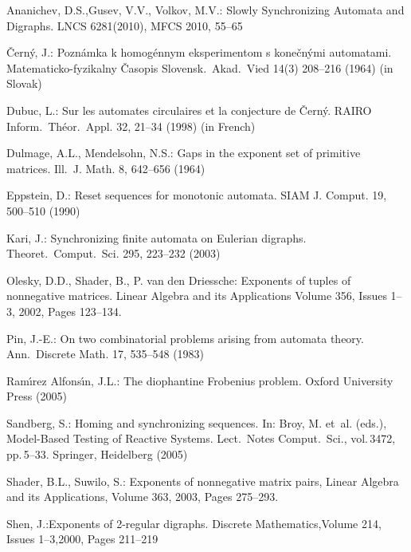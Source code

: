 \documentclass[11pt]{llncs}
\begin{document}
\begin{thebibliography}{99}


Ananichev, D.S.,Gusev, V.V., Volkov, M.V.: Slowly Synchronizing Automata and Digraphs.
LNCS 6281(2010), MFCS 2010, 55--65


\v{C}ern\'{y}, J.: Pozn\'{a}mka k homog\'{e}nnym eksperimentom s
kone\v{c}n\'{y}mi automatami. Matematicko-fyzikalny \v{C}asopis
Slovensk.\ Akad.\ Vied 14(3) 208--216 (1964) (in Slovak)

Dubuc, L.: Sur les automates circulaires et la conjecture de
\v{C}ern\'y. RAIRO Inform.\ Th\'eor.\ Appl. 32, 21--34 (1998) (in
French)


Dulmage, A.L., Mendelsohn, N.S.: Gaps in the exponent set of primitive
matrices. Ill.\ J. Math. 8, 642--656 (1964)

Eppstein, D.: Reset sequences for monotonic automata. SIAM J.
Comput. 19, 500--510 (1990)


Kari, J.: Synchronizing finite automata on Eulerian digraphs.
Theoret.\ Comput.\ Sci. 295, 223--232 (2003)

Olesky, D.D., Shader, B., P. van den Driessche: Exponents of tuples of nonnegative matrices. Linear Algebra and its Applications
Volume 356, Issues 1--3, 2002, Pages 123--134.

Pin, J.-E.: On two combinatorial problems arising from automata
theory. Ann.\ Discrete Math. 17, 535--548 (1983)

Ram\'{\i}rez Alfons\'{\i}n, J.L.: The diophantine Frobenius problem.
Oxford University Press (2005)

Sandberg, S.: Homing and synchronizing sequences. In: Broy, M.
et~al. (eds.), Model-Based Testing of Reactive Systems. Lect.\
Notes Comput.\ Sci., vol.\,3472, pp.\,5--33. Springer, Heidelberg
(2005)

Shader, B.L., Suwilo, S.: Exponents of nonnegative matrix pairs, Linear Algebra and its Applications, Volume 363, 2003, Pages 275--293.


Shen, J.:Exponents of 2-regular digraphs. Discrete Mathematics,Volume 214, Issues 1--3,2000, Pages 211--219


\end{thebibliography}
\end{document}
